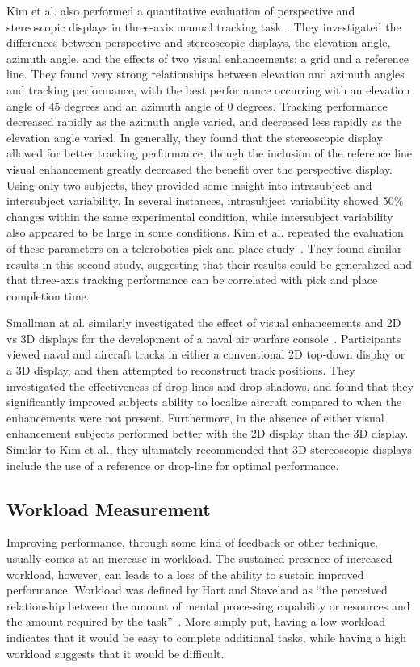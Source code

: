 \documentclass{paper}
\begin{document}
Kim et al. also performed a quantitative evaluation of perspective and stereoscopic displays in three-axis manual tracking task~\cite{Kim1987}.
They investigated the differences between perspective and stereoscopic displays, the elevation angle, azimuth angle, and the effects of two visual enhancements: a grid and a reference line.
They found very strong relationships between elevation and azimuth angles and tracking performance, with the best performance occurring with an elevation angle of 45 degrees and an azimuth angle of 0 degrees.
Tracking performance decreased rapidly as the azimuth angle varied, and decreased less rapidly as the elevation angle varied.
In generally, they found that the stereoscopic display allowed for better tracking performance, though the inclusion of the reference line visual enhancement greatly decreased the benefit over the perspective display.
Using only two subjects, they provided some insight into intrasubject and intersubject variability.
In several instances, intrasubject variability showed 50\% changes within the same experimental condition, while intersubject variability also appeared to be large in some conditions.
Kim et al. repeated the evaluation of these parameters on a telerobotics pick and place study~\cite{WonKim1987}.
They found similar results in this second study, suggesting that their results could be generalized and that three-axis tracking performance can be correlated with pick and place completion time.

Smallman at al. similarly investigated the effect of visual enhancements and 2D vs 3D displays for the development of a naval air warfare console~\cite{Smallman2000}.
Participants viewed naval and aircraft tracks in either a conventional 2D top-down display or a 3D display, and then attempted to reconstruct track positions.
They investigated the effectiveness of drop-lines and drop-shadows, and found that they significantly improved subjects ability to localize aircraft compared to when the enhancements were not present.
Furthermore, in the absence of either visual enhancement subjects performed better with the 2D display than the 3D display.
Similar to Kim et al., they ultimately recommended that 3D stereoscopic displays include the use of a reference or drop-line for optimal performance.

\subsection{Workload Measurement}
Improving performance, through some kind of feedback or other technique, usually comes at an increase in workload.
The sustained presence of increased workload, however, can leads to a loss of the ability to sustain improved performance.
Workload was defined by Hart and Staveland as ``the perceived relationship between the amount of mental processing capability or resources and the amount required by the task''~\cite{Hart1988}.
More simply put, having a low workload indicates that it would be easy to complete additional tasks, while having a high workload suggests that it would be difficult.
\end{document}
